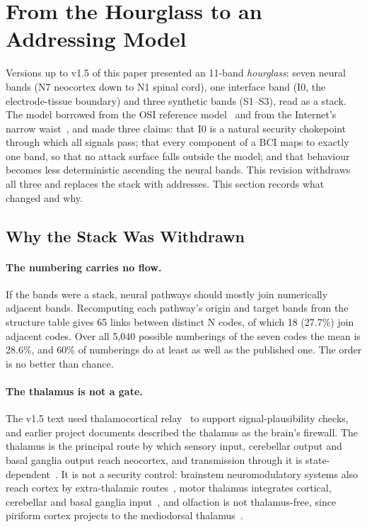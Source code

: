 
\section{From the Hourglass to an Addressing Model}
\label{sec:hourglass}

Versions up to v1.5 of this paper presented an 11-band \emph{hourglass}: seven neural
bands (N7 neocortex down to N1 spinal cord), one interface band (I0, the electrode-tissue
boundary) and three synthetic bands (S1--S3), read as a stack. The model borrowed from the
OSI reference model~\cite{zimmermann1980osi} and from the Internet's narrow
waist~\cite{deering1998hourglass}, and made three claims: that I0 is a natural security
chokepoint through which all signals pass; that every component of a BCI maps to exactly
one band, so that no attack surface falls outside the model; and that behaviour becomes
less deterministic ascending the neural bands. This revision withdraws all three and
replaces the stack with addresses. This section records what changed and why.

\subsection{Why the Stack Was Withdrawn}

\paragraph{The numbering carries no flow.}
If the bands were a stack, neural pathways should mostly join numerically adjacent bands.
Recomputing each pathway's origin and target bands from the structure table gives 65
links between distinct N codes, of which 18 (27.7\%) join adjacent codes. Over all 5,040
possible numberings of the seven codes the mean is 28.6\%, and 60\% of numberings do at
least as well as the published one. The order is no better than chance.

\paragraph{The thalamus is not a gate.}
The v1.5 text used thalamocortical relay~\cite{sherman2006thalamus} to support
signal-plausibility checks, and earlier project documents described the thalamus as the
brain's firewall. The thalamus is the principal route by which sensory input, cerebellar
output and basal ganglia output reach neocortex, and transmission through it is
state-dependent~\cite{sherman2016thalamuscentral}. It is not a security control:
brainstem neuromodulatory systems also reach cortex by extra-thalamic
routes~\cite{edlow2012ascendingarousal}, motor thalamus integrates cortical, cerebellar and
basal ganglia input~\cite{boschbouju2013motorthalamus}, and olfaction is not thalamus-free,
since piriform cortex projects to the mediodorsal thalamus~\cite{courtiol2015olfactorythalamus}.

